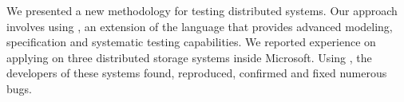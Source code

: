We presented a new methodology for testing distributed systems. Our approach involves using \psharp, an extension of the \csharp language that provides advanced modeling, specification and systematic testing capabilities. We reported experience on applying \psharp on three distributed storage systems inside Microsoft. Using \psharp, the developers of these systems found, reproduced, confirmed and fixed numerous bugs.